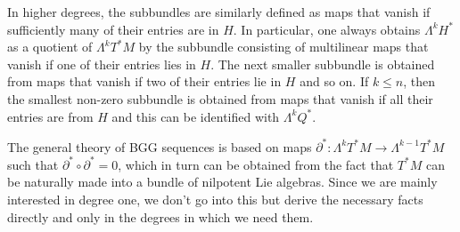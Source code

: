 \documentclass[11pt]{amsart}
\numberwithin{proposition}{section}
\numberwithin{equation}{section}
\begin{document}
In higher degrees, the subbundles are similarly defined as maps that vanish if sufficiently many of their entries are in $H$. In particular, one always obtains $\Lambda^k H^*$ as a quotient of $\Lambda^kT^*M$ by the subbundle consisting of multilinear maps that vanish if one of their entries lies in $H$. The next smaller subbundle is obtained from maps that vanish if two of their entries lie in $H$ and so on. If $k\leq n$, then the smallest non-zero subbundle is obtained from maps that vanish if all their entries are from $H$ and this can be identified with $\Lambda^kQ^*$. 

The general theory of BGG sequences is based on maps $\partial^*:\Lambda^kT^*M\to\Lambda^{k-1}T^*M$ such that $\partial^*\circ\partial^*=0$, which in turn can be obtained from the fact that $T^*M$ can be naturally made into a bundle of nilpotent Lie algebras. Since we are mainly interested in degree one, we don't go into this but derive the necessary facts directly and only in the degrees in which we need them. 
\end{document}
